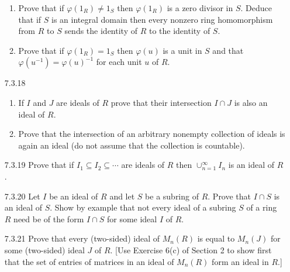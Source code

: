 \begin{enumerate}
\begin{enumerate}
                     \item Prove that if $\varphi(1_R) \neq 1_S$ then
                           $\varphi(1_R)$ is a zero divisor in $S$. Deduce that
                           if $S$ is an integral domain then every nonzero ring
                           homomorphism from $R$ to $S$ sends the identity of
                           $R$ to the identity of $S$.
                     \item Prove that if $\varphi(1_R) = 1_S$ then $\varphi(u)$
                           is a unit in $S$ and that
                           $\varphi(u^{-1}) = \varphi(u)^{-1}$ for each unit $u$ 
                           of $R$.
                  \end{enumerate}
   \item[7.3.18]  \begin{enumerate}
                     \item If $I$ and $J$ are ideals of $R$ prove that their
                           intersection $I \cap J$ is also an ideal of $R$.
                     \item Prove that the intersection of an arbitrary nonempty
                           collection of ideals is again an ideal (do not assume
                           that the collection is countable).
                  \end{enumerate}
   \item[7.3.19]  Prove that if $I_1 \subseteq I_2 \subseteq \cdots$ are ideals
                  of $R$ then $\cup_{n=1}^\infty I_n$ is an ideal of $R$.
   \item[7.3.20]  Let $I$ be an ideal of $R$ and let $S$ be a subring of $R$.
                  Prove that $I \cap S$ is an ideal of $S$. Show by example that
                  not every ideal of a subring $S$ of a ring $R$ need be of the
                  form $I \cap S$ for some ideal $I$ of $R$.
   \item[7.3.21]  Prove that every (two-sided) ideal of $M_n(R)$ is equal to
                  $M_n(J)$ for some (two-sided) ideal $J$ of $R$. [Use Exercise
                  6(c) of Section 2 to show first that the set of entries of
                  matrices in an ideal of $M_n(R)$ form an ideal in $R$.]

\end{enumerate}

